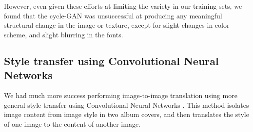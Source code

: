 \documentclass{article}
\begin{document}
However, even given these efforts at limiting the variety in our training sets, we found that the cycle-GAN was unsuccessful at producing any meaningful structural change in the image or texture, except for slight changes in color scheme, and slight blurring in the fonts.


\subsection{Style transfer using Convolutional Neural Networks}

We had much more success performing image-to-image translation using more general style transfer using Convolutional Neural Networks \cite{DBLP:journals/corr/GatysEB15a}. This method isolates image content from image style in two album covers, and then translates the style of one image to the content of another image.
\end{document}
